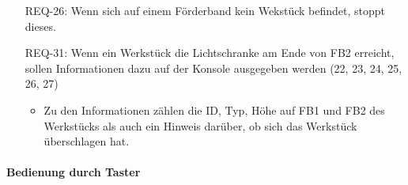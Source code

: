 \begin{itemize}
    \item[REQ-26:] Wenn sich auf einem Förderband kein Wekstück befindet, stoppt dieses.
    \item[REQ-31:] Wenn ein Werkstück die Lichtschranke am Ende von FB2 erreicht, sollen Informationen dazu auf der Konsole ausgegeben werden (22, 23, 24, 25, 26, 27)
    \begin{itemize}
        \item Zu den Informationen zählen die ID, Typ, Höhe auf FB1 und FB2 des Werkstücks als auch ein Hinweis darüber, ob sich das Werkstück überschlagen hat.
    \end{itemize}
\end{itemize}

\paragraph{Bedienung durch Taster}
